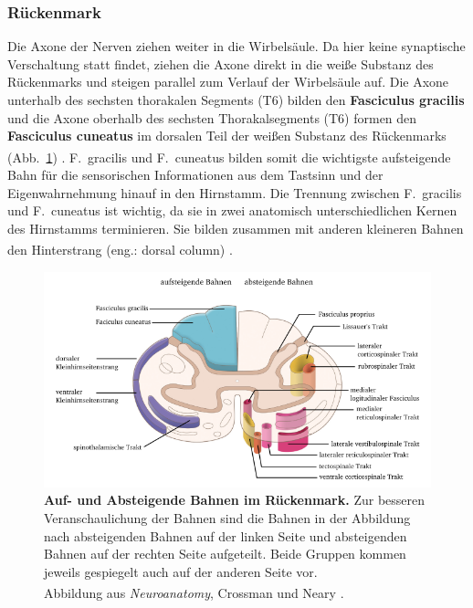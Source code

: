 \documentclass[12pt,a4paper,pdftex]{article}
\begin{document}
\subsubsection*{Rückenmark}
Die Axone der Nerven ziehen weiter in die Wirbelsäule. Da hier keine synaptische Verschaltung statt findet, ziehen die Axone direkt in die weiße Substanz des Rückenmarks und steigen parallel zum Verlauf der Wirbelsäule auf. Die Axone unterhalb des sechsten thorakalen Segments (T6) bilden den \textbf{Fasciculus gracilis}  und die Axone oberhalb des sechsten Thorakalsegments (T6) formen den \textbf{Fasciculus cuneatus}  im dorsalen Teil der weißen Substanz des Rückenmarks (Abb.~\ref{fig:bahnen_rueckenmark}) \textsuperscript{\cite[8]{paxinos2014rat}}. F.~gracilis und F.~cuneatus bilden somit die wichtigste aufsteigende Bahn für die sensorischen Informationen aus dem Tastsinn und der Eigenwahrnehmung hinauf in den Hirnstamm. 
Die Trennung zwischen F.~gracilis und F.~cuneatus ist wichtig, da sie in zwei anatomisch unterschiedlichen Kernen des Hirnstamms terminieren. Sie bilden zusammen mit anderen kleineren Bahnen den Hinterstrang (eng.: dorsal column) \textsuperscript{\cite[22]{kandel2013principles}}. 

\begin{figure}[H]
    \centering
    \includegraphics [width = \textwidth]
    {pictures/somatosensory/aufabsteigendeBahnen_Rueckenmark.png}
    \caption[Auf- und Absteigende Bahnen im Rückenmark]{\textbf{Auf- und Absteigende Bahnen im Rückenmark.} Zur besseren Veranschaulichung der Bahnen sind die Bahnen in der Abbildung nach absteigenden Bahnen auf der linken Seite und absteigenden Bahnen auf der rechten Seite aufgeteilt. Beide Gruppen kommen jeweils gespiegelt auch auf der anderen Seite vor. \\
    Abbildung aus \textit{Neuroanatomy}, Crossman und Neary
    \textsuperscript{\cite[8]{crossman2014neuroanatomy}}.}
    \label{fig:bahnen_rueckenmark}
\end{figure}
\end{document}

